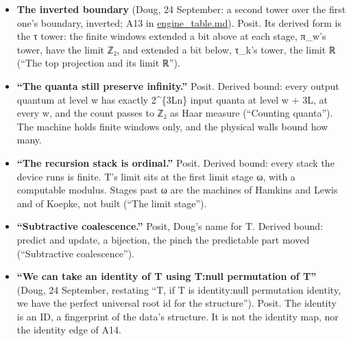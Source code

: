 \begin{itemize}
\begin{itemize}
\item An infinite expansion is not infinite complexity. 1/3 = …10101011 never ends, and a program a few bits long prints any window of it: K(π\_\allowbreak{}w(1/3)) ≤ K(w) + c = O(log w).
\item For a computable x ∈ ℤ₂, K(π\_\allowbreak{}w(x)) ≤ K(x) + O(log w): run x's program to w digits, given w.
\item Haar-almost every element of ℤ₂ is Martin-Löf random (Martin-Löf 1966). The Haar measure on ℤ₂ is the fair coin on its digits, and the random sequences have measure 1. A random element is not computable.
\item The machine reaches finite windows only. Every register is π\_\allowbreak{}w of something, and any w-bit window has K ≤ w + O(log w). Every constant in a program is a finite description, and the machine's reach is the windows of computable elements.
\item “Infinitely complex” can name only a limit object the machine never holds whole. Which object the anchors are, and whether they are random elements of ℤ₂, is open. “Bending the information field” has no definition here to derive from.
\end{itemize}
\item \textbf{The inverted boundary} (Doug, 24 September: a second tower over the first one's boundary, inverted; A13 in \hyperref[chap:engine-table]{engine\_\allowbreak{}table.md}). Posit. Its derived form is the τ tower: the finite windows extended a bit above at each stage, π\_\allowbreak{}w's tower, have the limit ℤ₂, and extended a bit below, τ\_\allowbreak{}k's tower, the limit ℝ (“The top projection and its limit ℝ”).
\item \textbf{“The quanta still preserve infinity.”} Posit. Derived bound: every output quantum at level w has exactly 2\textasciicircum{}\{3Ln\} input quanta at level w + 3L, at every w, and the count passes to ℤ₂ as Haar measure (“Counting quanta”). The machine holds finite windows only, and the physical walls bound how many.
\item \textbf{“The recursion stack is ordinal.”} Posit. Derived bound: every stack the device runs is finite. T's limit sits at the first limit stage ω, with a computable modulus. Stages past ω are the machines of Hamkins and Lewis and of Koepke, not built (“The limit stage”).
\item \textbf{“Subtractive coalescence.”} Posit, Doug's name for T. Derived bound: predict and update, a bijection, the pinch the predictable part moved (“Subtractive coalescence”).
\item \textbf{“We can take an identity of T using T:null permutation of T”} (Doug, 24 September, restating “T, if T is identity:null permutation identity, we have the perfect universal root id for the structure”). Posit. The identity is an ID, a fingerprint of the data's structure. It is not the identity map, nor the identity edge of A14.


\end{itemize}
